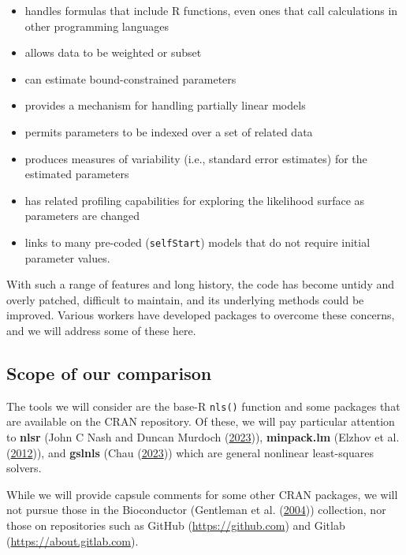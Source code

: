 \documentclass[
]{article}
\providecommand{\tightlist}{%
  \setlength{\itemsep}{0pt}\setlength{\parskip}{0pt}}
\begin{document}
\begin{itemize}
\tightlist
\item
  handles formulas that include R functions, even ones that call
  calculations in other programming languages
\item
  allows data to be weighted or subset
\item
  can estimate bound-constrained parameters
\item
  provides a mechanism for handling partially linear models
\item
  permits parameters to be indexed over a set of related data
\item
  produces measures of variability (i.e., standard error estimates) for
  the estimated parameters
\item
  has related profiling capabilities for exploring the likelihood
  surface as parameters are changed
\item
  links to many pre-coded (\texttt{selfStart}) models that do not
  require initial parameter values.
\end{itemize}

With such a range of features and long history, the code has become
untidy and overly patched, difficult to maintain, and its underlying
methods could be improved. Various workers have developed packages to
overcome these concerns, and we will address some of these here.

\hypertarget{scope-of-our-comparison}{%
\subsection{Scope of our comparison}\label{scope-of-our-comparison}}

The tools we will consider are the base-R \texttt{nls()} function and
some packages that are available on the CRAN repository. Of these, we
will pay particular attention to \textbf{nlsr} (John C Nash and Duncan
Murdoch (\protect\hyperlink{ref-nlsr2023manual}{2023})),
\textbf{minpack.lm} (Elzhov et al.
(\protect\hyperlink{ref-minpacklm12}{2012})), and \textbf{gslnls} (Chau
(\protect\hyperlink{ref-gslnls23}{2023})) which are general nonlinear
least-squares solvers.

While we will provide capsule comments for some other CRAN packages, we
will not pursue those in the Bioconductor (Gentleman et al.
(\protect\hyperlink{ref-Bioconductor}{2004})) collection, nor those on
repositories such as GitHub (\url{https://github.com}) and Gitlab
(\url{https://about.gitlab.com}).
\end{document}
